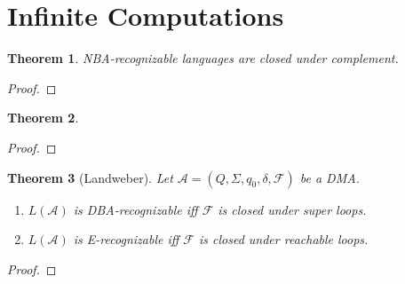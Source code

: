 \documentclass{article}
\newtheorem{theorem}{Theorem}
\begin{document}
\section{Infinite Computations}
\begin{theorem}
\label{nba_complement}
	NBA-recognizable languages are closed under complement.
\end{theorem}
\begin{proof}
\end{proof}


\vspace{1cm}
\begin{theorem}
\label{ltl_to_nba}

\end{theorem}
\begin{proof}
\end{proof}


\vspace{1cm}
\begin{theorem}[Landweber]
\label{landweber}
	Let $\mathcal{A} = (Q, \Sigma, q_0, \delta, \mathcal{F})$ be a DMA. 
	\begin{enumerate}
		\item $L(\mathcal{A})$ is DBA-recognizable iff $\mathcal{F}$ is closed under super loops.
		\item $L(\mathcal{A})$ is E-recognizable iff $\mathcal{F}$ is closed under reachable loops.
	\end{enumerate}
\end{theorem}
\begin{proof}
\end{proof}


\newpage
\end{document}
